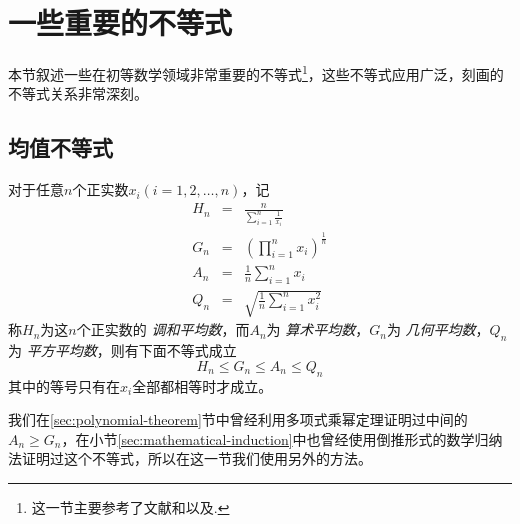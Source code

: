 
\section{一些重要的不等式}
\label{sec:some-important-inequation}

本节叙述一些在初等数学领域非常重要的不等式\footnote{这一节主要参考了文献\cite{contest-math-course}和\cite{caculus-course}以及\cite{olympic-math}.}，这些不等式应用广泛，刻画的不等式关系非常深刻。

\subsection{均值不等式}

\begin{theorem}[均值不等式]
  对于任意$n$个正实数$x_{i}(i=1,2,\ldots,n)$，记
  \begin{eqnarray}
    \label{eq:definition-of-average}
    H_n &=& \frac{n}{\sum_{i=1}^n \frac{1}{x_i}} \\
    G_n &=& (\prod_{i=1}^nx_{i})^{\frac{1}{n}} \\
    A_n &=& \frac{1}{n}\sum_{i=1}^{n}x_i \\
    Q_n &=& \sqrt{\frac{1}{n}\sum_{i=1}^nx_i^2}
  \end{eqnarray}
  称$H_{n}$为这$n$个正实数的 \emph{调和平均数}，而$A_{n}$为 \emph{算术平均数}，$G_n$为 \emph{几何平均数}，$Q_{n}$为 \emph{平方平均数}，则有下面不等式成立
  \begin{equation}
    \label{eq:mean-inequation-general}
    H_{n} \leqslant G_{n} \leqslant A_{n} \leqslant Q_{n}
  \end{equation}
  其中的等号只有在$x_{i}$全部都相等时才成立。
\end{theorem}

我们在\ref{sec:polynomial-theorem}节中曾经利用多项式乘幂定理证明过中间的$A_n \geqslant G_n$，在小节\ref{sec:mathematical-induction}中也曾经使用倒推形式的数学归纳法证明过这个不等式，所以在这一节我们使用另外的方法。

